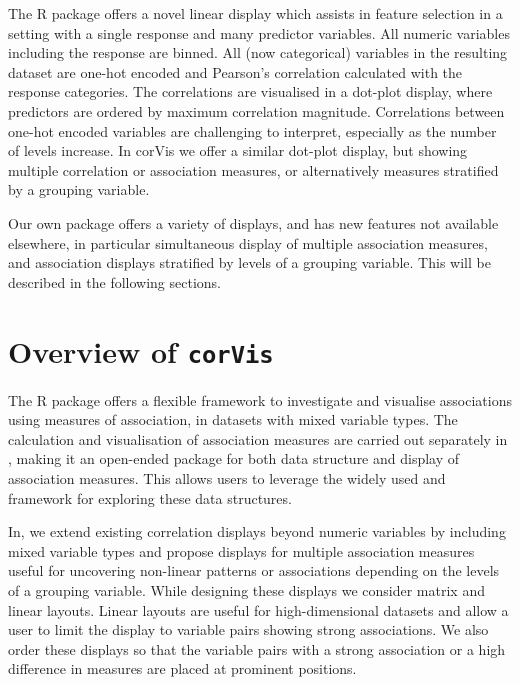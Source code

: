 The R package  offers a novel linear display which assists in feature selection in a setting with a single response and many predictor variables. All numeric variables including the response are binned. All (now categorical) variables in the resulting dataset are one-hot encoded and Pearson's correlation calculated with the response categories. The correlations are visualised in a dot-plot display, where predictors are ordered by maximum correlation magnitude. Correlations between one-hot encoded variables are challenging to interpret, especially as the number of levels increase. In corVis we offer a similar dot-plot display, but showing multiple correlation or association measures, or alternatively measures stratified by a grouping variable.

Our own package  offers a variety of displays, and has new features not available elsewhere, in particular simultaneous display of multiple association measures, and association displays stratified by levels of a grouping variable. This will be described in the following sections.

\hypertarget{overview-of-corvis}{%
\section{\texorpdfstring{Overview of \texttt{corVis}}{Overview of corVis}}\label{overview-of-corvis}}

The R package  offers a flexible framework to investigate and visualise associations using measures of association, in datasets with mixed variable types. The calculation and visualisation of association measures are carried out separately in , making it an open-ended package for both data structure and display of association measures. This allows users to leverage the widely used  and  framework for exploring these data structures.

In, we extend existing correlation displays beyond numeric variables by including mixed variable types and propose displays for multiple association measures useful for uncovering non-linear patterns or associations depending on the levels of a grouping variable. While designing these displays we consider matrix and linear layouts. Linear layouts are useful for high-dimensional datasets and allow a user to limit the display to variable pairs showing strong associations. We also order these displays so that the variable pairs with a strong association or a high difference in measures are placed at prominent positions.

